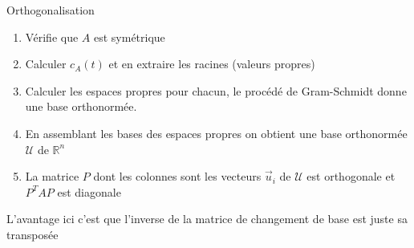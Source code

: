 \begin{parag}{Orthogonalisation}
\begin{truc}
\begin{itemize}
        \end{itemize}
    \end{truc}
\begin{enumerate}
    \item Vérifie que $A$ est symétrique
    \item Calculer $c_A(t)$ et en extraire les racines (valeurs propres)
    \item Calculer les espaces propres pour chacun, le procédé de Gram-Schmidt donne une base orthonormée.
    \item En assemblant les bases des espaces propres on obtient une base orthonormée $\mathcal{U}$ de $\mathbb{R}^n$
    \item La matrice $P$ dont les colonnes sont les vecteurs $\vec{u}_i$ de $\mathcal{U}$ est orthogonale et $P^TAP$ est diagonale
\end{enumerate}   
\begin{framedremark}
    L'avantage ici c'est que l'inverse de la matrice de changement de base est juste sa transposée
\end{framedremark}
\end{parag}

